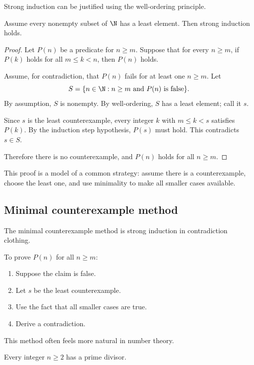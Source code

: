 Strong induction can be justified using the well-ordering principle.

\begin{theorem}
Assume every nonempty subset of $\N$ has a least element. Then strong induction holds.
\end{theorem}

\begin{proof}
Let $P(n)$ be a predicate for $n\geq m$. Suppose that for every $n\geq m$, if $P(k)$ holds for all $m\leq k<n$, then $P(n)$ holds.

Assume, for contradiction, that $P(n)$ fails for at least one $n\geq m$. Let
\[
S=\{n\in\N:n\geq m\text{ and }P(n)\text{ is false}\}.
\]
By assumption, $S$ is nonempty. By well-ordering, $S$ has a least element; call it $s$.

Since $s$ is the least counterexample, every integer $k$ with $m\leq k<s$ satisfies $P(k)$. By the induction step hypothesis, $P(s)$ must hold. This contradicts $s\in S$.

Therefore there is no counterexample, and $P(n)$ holds for all $n\geq m$.
\end{proof}

This proof is a model of a common strategy: assume there is a counterexample, choose the least one, and use minimality to make all smaller cases available.

\subsection{Minimal counterexample method}

The minimal counterexample method is strong induction in contradiction clothing.

To prove $P(n)$ for all $n\geq m$:

\begin{enumerate}
\item Suppose the claim is false.
\item Let $s$ be the least counterexample.
\item Use the fact that all smaller cases are true.
\item Derive a contradiction.
\end{enumerate}

This method often feels more natural in number theory.

\begin{theorem}
Every integer $n\geq2$ has a prime divisor.
\end{theorem}

